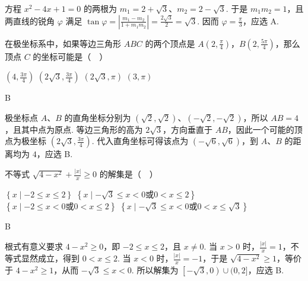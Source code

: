 \begin{solution}
方程 \(x^2-4x+1=0\) 的两根为 \(m_1=2+\sqrt3\)、\(m_2=2-\sqrt3\). 于是 \(m_1m_2=1\)，且两直线的锐角 \(\varphi\) 满足
\(\tan\varphi=\left|\frac{m_1-m_2}{1+m_1m_2}\right|=\frac{2\sqrt3}{2}=\sqrt3\). 因而 \(\varphi=\frac\pi3\)，应选 A.
\end{solution}

\begin{problem}
在极坐标系中，如果等边三角形 \(ABC\) 的两个顶点是 \(A\left( 2,\frac{\pi}{4} \right)\)，\(B\left( 2,\frac{5\pi}{4} \right)\)，那么顶点 \(C\) 的坐标可能是（\(\quad\)）

\choices
    {\(\left( 4,\frac{3\pi}{4} \right)\)}
    {\(\left( 2\sqrt{3},\frac{3\pi}{4} \right)\)}
    {\(\left( 2\sqrt{3},\pi \right)\)}
    {\((3,\pi)\)}
\end{problem}

\begin{answer}
B
\end{answer}

\begin{solution}
极坐标点 \(A\)、\(B\) 的直角坐标分别为 \((\sqrt2,\sqrt2)\)、\((-\sqrt2,-\sqrt2)\)，所以 \(AB=4\)，且其中点为原点. 等边三角形的高为 \(2\sqrt3\)，方向垂直于 \(AB\)，因此一个可能的顶点为极坐标 \(\left(2\sqrt3,\frac{3\pi}{4}\right)\). 代入直角坐标可得该点为 \((-\sqrt6,\sqrt6)\)，到 \(A\)、\(B\) 的距离均为 \(4\)，应选 B.
\end{solution}

\begin{problem}
不等式 \(\sqrt{4-x^2}+\frac{\left| x \right|}{x}\geqslant 0\) 的解集是（\(\quad\)）

\choices
    {\(\left\{ x\mid -2\leqslant x\leqslant 2 \right\}\)}
    {\(\left\{ x\mid -\sqrt{3}\leqslant x<0\text{或}0<x\leqslant 2 \right\}\)}
    {\(\left\{ x\mid -2\leqslant x<0\text{或}0<x\leqslant 2 \right\}\)}
    {\(\left\{ x\mid -\sqrt{3}\leqslant x<0\text{或}0<x\leqslant \sqrt{3} \right\}\)}
\end{problem}

\begin{answer}
B
\end{answer}

\begin{solution}
根式有意义要求 \(4-x^2\geqslant0\)，即 \(-2\leqslant x\leqslant2\)，且 \(x\neq0\). 当 \(x>0\) 时，\(\frac{|x|}{x}=1\)，不等式显然成立，得到 \(0<x\leqslant2\). 当 \(x<0\) 时，\(\frac{|x|}{x}=-1\)，于是
\(\sqrt{4-x^2}\geqslant1\)，等价于 \(4-x^2\geqslant1\)，从而 \(-\sqrt3\leqslant x<0\). 所以解集为 \(\left[-\sqrt3,0\right)\cup(0,2]\)，应选 B.
\end{solution}

